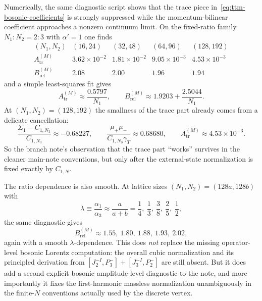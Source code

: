 \documentclass[11pt]{article}
\numberwithin{equation}{section}
\begin{document}
Numerically, the same diagnostic script shows that the trace piece in~\eqref{eq:ttm-bosonic-coefficients} is strongly suppressed while the momentum-bilinear coefficient approaches a nonzero continuum limit. On the fixed-ratio family $N_1:N_2=2:3$ with $\alpha'=1$ one finds
\begin{equation}
\label{eq:s12-2-017}
\begin{array}{c|cccc}
(N_1,N_2) & (16,24) & (32,48) & (64,96) & (128,192) \\
\hline
A_{\mathrm{tr}}^{(M)}
& 3.62\times 10^{-2}
& 1.81\times 10^{-2}
& 9.05\times 10^{-3}
& 4.53\times 10^{-3}\\
B_{\mathrm{rel}}^{(M)}
& 2.08
& 2.00
& 1.96
& 1.94
\end{array}
\end{equation}
and a simple least-squares fit gives
\begin{equation}
\label{eq:s12-2-018}
A_{\mathrm{tr}}^{(M)}\approx \frac{0.5797}{N_1},
\qquad
B_{\mathrm{rel}}^{(M)}\approx 1.9203 + \frac{2.5044}{N_1}.
\end{equation}
At $(N_1,N_2)=(128,192)$ the smallness of the trace part already comes from a delicate cancellation:
\begin{equation}
\label{eq:s12-2-019}
\frac{\Sigma_1-C_{1,N_3}}{C_{1,N_3}}\approx -0.68227,
\qquad
\frac{\mu_+\mu_-}{C_{1,N_3}\gamma_T}\approx 0.68680,
\qquad
A_{\mathrm{tr}}^{(M)}\approx 4.53\times 10^{-3}.
\end{equation}
So the branch note's observation that the trace part ``works'' survives in the cleaner main-note conventions, but only after the external-state normalization is fixed exactly by $C_{1,N}$.

The ratio dependence is also smooth. At lattice sizes $(N_1,N_2)=(128a,128b)$ with
\begin{equation}
\label{eq:s12-2-020}
\lambda\equiv \frac{\alpha_1}{\alpha_3}\approx \frac{a}{a+b}
=
\frac14,\ \frac13,\ \frac38,\ \frac25,\ \frac12,
\end{equation}
the same diagnostic gives
\begin{equation}
\label{eq:s12-2-021}
B_{\mathrm{rel}}^{(M)}
\approx
1.55,\ 1.80,\ 1.88,\ 1.93,\ 2.02,
\end{equation}
again with a smooth $\lambda$-dependence. This does \emph{not} replace the missing operator-level bosonic Lorentz computation: the overall cubic normalization and its principled derivation from $[J^{-I}_2,P^-_3]+[J^{-I}_3,P^-_2]$ are still absent. But it does add a second explicit bosonic amplitude-level diagnostic to the note, and more importantly it fixes the first-harmonic massless normalization unambiguously in the finite-$N$ conventions actually used by the discrete vertex.
\end{document}
